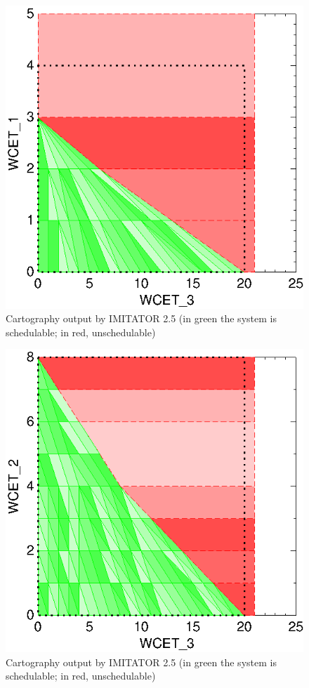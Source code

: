 \documentclass{article}
\begin{document}
\begin{figure}[!ht]
	\centering
 	\includegraphics[scale = 0.4]{./Figures/C3-C1.png}
	\caption{Cartography output by IMITATOR 2.5 (in green the system is schedulable; in red, unschedulable)}
	\label{fig:carto2}
\end{figure}

\begin{figure}[!ht]
	\centering
 	\includegraphics[scale = 0.4]{./Figures/C3-C2.png}
	\caption{Cartography output by IMITATOR 2.5 (in green the system is schedulable; in red, unschedulable)}
	\label{fig:carto3}
\end{figure}
\end{document}
